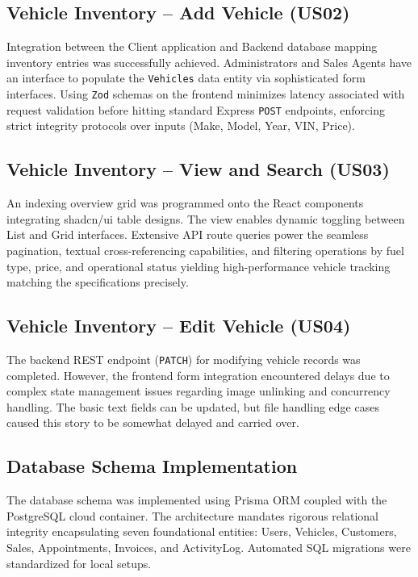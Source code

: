 \documentclass[12pt,a4paper]{article}
\begin{document}
\subsection{Vehicle Inventory -- Add Vehicle (US02)}

Integration between the Client application and Backend database mapping inventory entries was successfully achieved. Administrators and Sales Agents have an interface to populate the \texttt{Vehicles} data entity via sophisticated form interfaces. Using \texttt{Zod} schemas on the frontend minimizes latency associated with request validation before hitting standard Express \texttt{POST} endpoints, enforcing strict integrity protocols over inputs (Make, Model, Year, VIN, Price).

\subsection{Vehicle Inventory -- View and Search (US03)}

An indexing overview grid was programmed onto the React components integrating shadcn/ui table designs. The view enables dynamic toggling between List and Grid interfaces. Extensive API route queries power the seamless pagination, textual cross-referencing capabilities, and filtering operations by fuel type, price, and operational status yielding high-performance vehicle tracking matching the specifications precisely. 

\subsection{Vehicle Inventory -- Edit Vehicle (US04)}

The backend REST endpoint (\texttt{PATCH}) for modifying vehicle records was completed. However, the frontend form integration encountered delays due to complex state management issues regarding image unlinking and concurrency handling. The basic text fields can be updated, but file handling edge cases caused this story to be somewhat delayed and carried over.

\subsection{Database Schema Implementation}

The database schema was implemented using Prisma ORM coupled with the PostgreSQL cloud container. The architecture mandates rigorous relational integrity encapsulating seven foundational entities: Users, Vehicles, Customers, Sales, Appointments, Invoices, and ActivityLog. Automated SQL migrations were standardized for local setups.
\end{document}

